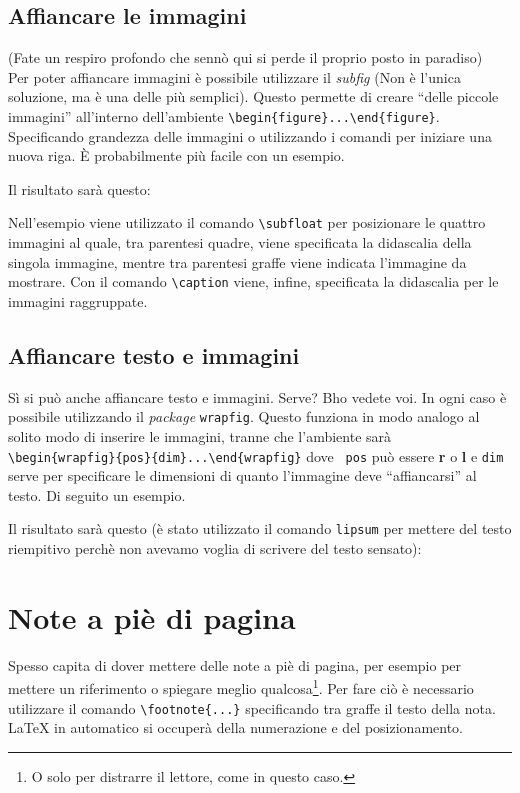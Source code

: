 \subsection{Affiancare le immagini}
(Fate un respiro profondo che sennò qui si perde il proprio posto in paradiso) 
\\
Per poter affiancare immagini è possibile utilizzare il \textit{subfig} (Non è 
l'unica soluzione, ma è una delle più semplici). Questo permette di creare 
``delle piccole immagini'' all'interno dell'ambiente 
\verb!\begin{figure}...\end{figure}!. Specificando grandezza delle immagini o 
utilizzando i comandi per iniziare una nuova riga. È probabilmente più facile 
con un esempio.

Il risultato sarà questo:

Nell'esempio viene utilizzato il comando \verb!\subfloat! per posizionare le 
quattro immagini al quale, tra parentesi quadre, viene specificata la 
didascalia della singola immagine, mentre tra parentesi graffe viene indicata 
l'immagine da mostrare. Con il comando \verb!\caption! viene, infine, 
specificata la didascalia per le immagini raggruppate.

\subsection{Affiancare testo e immagini}
Sì si può anche affiancare testo e immagini. Serve? Bho vedete voi. In ogni 
caso è possibile utilizzando il \textit{package} \verb!wrapfig!. Questo 
funziona in modo analogo al solito modo di inserire le immagini, tranne che 
l'ambiente sarà \\
\verb!\begin{wrapfig}{pos}{dim}...\end{wrapfig}! dove \texttt{
pos} può essere \textbf{r} o \textbf{l} e \texttt{dim} serve per specificare 
le dimensioni di quanto l'immagine deve ``affiancarsi'' al testo. Di seguito 
un esempio. 

Il risultato sarà questo (è stato utilizzato il comando \texttt{lipsum} per 
mettere del testo riempitivo perchè non avevamo voglia di scrivere del testo 
sensato):
\newpage

\newpage

\section{Note a piè di pagina}
Spesso capita di dover mettere delle note a piè di pagina, per esempio per 
mettere un riferimento o spiegare meglio qualcosa\footnote{O solo per 
distrarre il lettore, come in questo caso.}. Per fare ciò è necessario 
utilizzare il comando \verb!\footnote{...}! specificando tra graffe il testo 
della nota. \LaTeX{} in automatico si occuperà della numerazione e del 
posizionamento.


